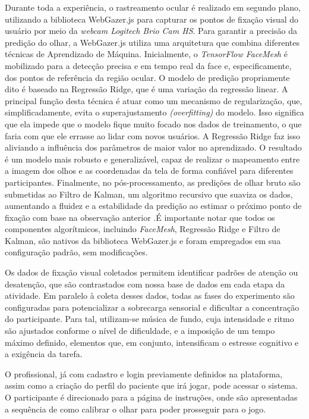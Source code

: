 Durante toda a experiência, o rastreamento ocular é realizado em segundo plano, utilizando a biblioteca WebGazer.js para capturar os pontos de fixação visual do usuário por meio da \textit{webcam Logitech Brio Cam HS}. Para garantir a precisão da predição do olhar, a WebGazer.js utiliza uma arquitetura que combina diferentes técnicas de Aprendizado de Máquina. Inicialmente, o \textit{TensorFlow FaceMesh} é mobilizado para a detecção precisa e em tempo real da face e, especificamente, dos pontos de referência da região ocular. O modelo de predição propriamente dito é baseado na Regressão Ridge, que é uma variação da regressão linear. A principal função desta técnica é atuar como um mecanismo de regularização, que, simplificadamente, evita o superajustamento \textit{(overfitting)} do modelo. Isso significa que ela impede que o modelo fique muito focado nos dados de treinamento, o que faria com que ele errasse ao lidar com novos usuários. A Regressão Ridge faz isso aliviando a influência dos parâmetros de maior valor no aprendizado. O resultado é um modelo mais robusto e generalizável, capaz de realizar o mapeamento entre a imagem dos olhos e as coordenadas da tela de forma confiável para diferentes participantes. Finalmente, no pós-processamento, as predições de olhar bruto são submetidas ao Filtro de Kalman, um algoritmo recursivo que suaviza os dados, aumentando a fluidez e a estabilidade da predição ao estimar o próximo ponto de fixação com base na observação anterior \cite{WebGazerDoc}.É importante notar que todos os componentes algorítmicos, incluindo \textit{FaceMesh}, Regressão Ridge e Filtro de Kalman, são nativos da biblioteca WebGazer.js e foram empregados em sua configuração padrão, sem modificações.

Os dados de fixação visual coletados permitem identificar padrões de atenção ou desatenção, que são contrastados com nossa base de dados em cada etapa da atividade. Em paralelo à coleta desses dados, todas as fases do experimento são configuradas para potencializar a sobrecarga sensorial e dificultar a concentração do participante. Para tal, utilizam-se música de fundo, cuja intensidade e ritmo são ajustados conforme o nível de dificuldade, e a imposição de um tempo máximo definido, elementos que, em conjunto, intensificam o estresse cognitivo e a exigência da tarefa.

O profissional, já com cadastro e login previamente definidos na plataforma, assim como a criação do perfil do paciente que irá jogar, pode acessar o sistema. O participante é direcionado para a página de instruções, onde são apresentadas a sequência de como calibrar o olhar para poder prosseguir para o jogo.

